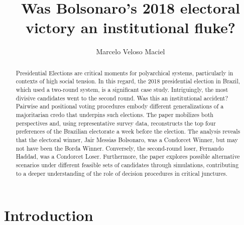 \documentclass[hidelinks,11pt]{article} \usepackage[utf8]{inputenc}
\author{Marcelo Veloso Maciel
} \date{}
\title{Was Bolsonaro's 2018 electoral victory an institutional fluke?}
\begin{document}
\maketitle
\begin{abstract}

  Presidential Elections are critical moments for polyarchical systems,
  particularly in contexts of high social tension. In this regard, the 2018
  presidential election in Brazil, which used a two-round system, is a
  significant case study. Intriguingly, the most divisive candidates went to the
  second round. Was this an institutional accident? Pairwise and positional
  voting procedures embody different generalizations of a majoritarian credo
  that underpins such elections. The paper mobilizes both perspectives and,
  using representative survey data, reconstructs the top four preferences of the
  Brazilian electorate a week before the election. The analysis reveals that the
  electoral winner, Jair Messias Bolsonaro, was a Condorcet Winner, but may not
  have been the Borda Winner. Conversely, the second-round loser, Fernando
  Haddad, was a Condorcet Loser. Furthermore, the paper explores possible
  alternative scenarios under different feasible sets of candidates through
  simulations, contributing to a deeper understanding of the role of decision
  procedures in critical junctures.


  \end{abstract}
\section{Introduction}
\end{document}
